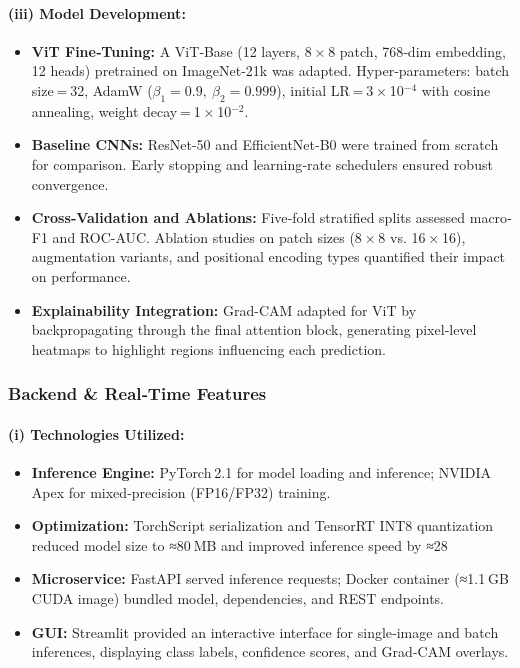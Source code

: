 \paragraph{(iii) Model Development:}
\begin{itemize}
    \item \textbf{ViT Fine‐Tuning:}  
    A ViT‐Base (12 layers, 8 × 8 patch, 768‐dim embedding, 12 heads) pretrained on ImageNet-21k was adapted. Hyper‐parameters: batch size = 32, AdamW ($\beta_1=0.9,\ \beta_2=0.999$), initial LR = 3 × 10$^{-4}$ with cosine annealing, weight decay = 1 × 10$^{-2}$.
    \item \textbf{Baseline CNNs:}  
    ResNet-50 and EfficientNet-B0 were trained from scratch for comparison. Early stopping and learning‐rate schedulers ensured robust convergence.
    \item \textbf{Cross‐Validation and Ablations:}  
    Five‐fold stratified splits assessed macro‐F1 and ROC-AUC. Ablation studies on patch sizes (8 × 8 vs. 16 × 16), augmentation variants, and positional encoding types quantified their impact on performance.
    \item \textbf{Explainability Integration:}  
    Grad-CAM adapted for ViT by backpropagating through the final attention block, generating pixel‐level heatmaps to highlight regions influencing each prediction.
\end{itemize}

\subsubsection*{Backend \& Real‐Time Features}

\paragraph{(i) Technologies Utilized:}
\begin{itemize}
    \item \textbf{Inference Engine:}  
    PyTorch 2.1 for model loading and inference; NVIDIA Apex for mixed‐precision (FP16/FP32) training.
    \item \textbf{Optimization:}  
    TorchScript serialization and TensorRT INT8 quantization reduced model size to ≈80 MB and improved inference speed by ≈28 %
    \item \textbf{Microservice:}  
    FastAPI served inference requests; Docker container (≈1.1 GB CUDA image) bundled model, dependencies, and REST endpoints.
    \item \textbf{GUI:}  
    Streamlit provided an interactive interface for single‐image and batch inferences, displaying class labels, confidence scores, and Grad-CAM overlays.
\end{itemize}

